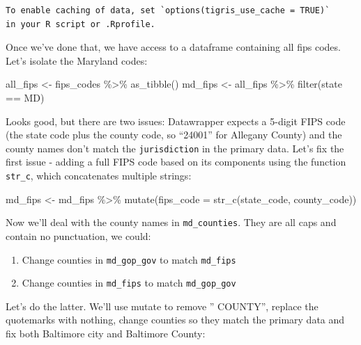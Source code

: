 \documentclass[
  letterpaper,
  DIV=11,
  numbers=noendperiod]{scrreprt}
\newenvironment{Shaded}{\begin{snugshade}}{\end{snugshade}}
\newcommand{\AttributeTok}[1]{\textcolor[rgb]{0.40,0.45,0.13}{#1}}
\newcommand{\FunctionTok}[1]{\textcolor[rgb]{0.28,0.35,0.67}{#1}}
\newcommand{\NormalTok}[1]{\textcolor[rgb]{0.00,0.23,0.31}{#1}}
\newcommand{\OtherTok}[1]{\textcolor[rgb]{0.00,0.23,0.31}{#1}}
\newcommand{\SpecialCharTok}[1]{\textcolor[rgb]{0.37,0.37,0.37}{#1}}
\newcommand{\StringTok}[1]{\textcolor[rgb]{0.13,0.47,0.30}{#1}}
\providecommand{\tightlist}{%
  \setlength{\itemsep}{0pt}\setlength{\parskip}{0pt}}\usepackage{longtable,booktabs,array}
\begin{document}
\begin{verbatim}
To enable caching of data, set `options(tigris_use_cache = TRUE)`
in your R script or .Rprofile.
\end{verbatim}

Once we've done that, we have access to a dataframe containing all fips
codes. Let's isolate the Maryland codes:

\begin{Shaded}
\begin{Highlighting}[]
\NormalTok{all\_fips }\OtherTok{\textless{}{-}}\NormalTok{ fips\_codes }\SpecialCharTok{\%\textgreater{}\%} \FunctionTok{as\_tibble}\NormalTok{()}
\NormalTok{md\_fips }\OtherTok{\textless{}{-}}\NormalTok{ all\_fips }\SpecialCharTok{\%\textgreater{}\%} \FunctionTok{filter}\NormalTok{(state }\SpecialCharTok{==} \StringTok{\textquotesingle{}MD\textquotesingle{}}\NormalTok{)}
\end{Highlighting}
\end{Shaded}

Looks good, but there are two issues: Datawrapper expects a 5-digit FIPS
code (the state code plus the county code, so ``24001'' for Allegany
County) and the county names don't match the \texttt{jurisdiction} in
the primary data. Let's fix the first issue - adding a full FIPS code
based on its components using the function \texttt{str\_c}, which
concatenates multiple strings:

\begin{Shaded}
\begin{Highlighting}[]
\NormalTok{md\_fips }\OtherTok{\textless{}{-}}\NormalTok{ md\_fips }\SpecialCharTok{\%\textgreater{}\%} \FunctionTok{mutate}\NormalTok{(}\AttributeTok{fips\_code =} \FunctionTok{str\_c}\NormalTok{(state\_code, county\_code))}
\end{Highlighting}
\end{Shaded}

Now we'll deal with the county names in \texttt{md\_counties}. They are
all caps and contain no punctuation, we could:

\begin{enumerate}
\def\labelenumi{\arabic{enumi}.}
\tightlist
\item
  Change counties in \texttt{md\_gop\_gov} to match \texttt{md\_fips}
\item
  Change counties in \texttt{md\_fips} to match \texttt{md\_gop\_gov}
\end{enumerate}

Let's do the latter. We'll use mutate to remove '' COUNTY'', replace the
quotemarks with nothing, change counties so they match the primary data
and fix both Baltimore city and Baltimore County:
\end{document}
